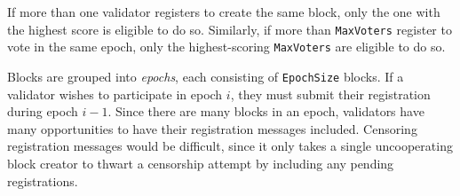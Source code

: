 If more than one validator registers to create the same block, only the one with the highest score is eligible to do so. Similarly, if more than \texttt{MaxVoters} register to vote in the same epoch, only the highest-scoring \texttt{MaxVoters} are eligible to do so.

Blocks are grouped into \emph{epochs}, each consisting of \texttt{EpochSize} blocks. If a validator wishes to participate in epoch $i$, they must submit their registration during epoch $i - 1$. Since there are many blocks in an epoch, validators have many opportunities to have their registration messages included. Censoring registration messages would be difficult, since it only takes a single uncooperating block creator to thwart a censorship attempt by including any pending registrations.
